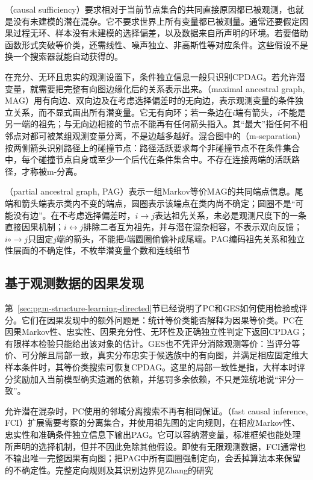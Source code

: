 （causal sufficiency）要求相对于当前节点集合的共同直接原因都已被观测，也就是没有未建模的潜在混杂。它不要求世界上所有变量都已被测量。通常还要假定因果过程无环、样本没有未建模的选择偏差，以及数据来自所声明的环境。若要借助函数形式突破等价类，还需线性、噪声独立、非高斯性等对应条件。这些假设不是换一个搜索器就能自动获得的。

在充分、无环且忠实的观测设置下，条件独立信息一般只识别CPDAG。若允许潜变量，就需要把完整有向图边缘化后的关系表示出来。（maximal ancestral graph, MAG）用有向边、双向边及在考虑选择偏差时的无向边，表示观测变量的条件独立关系，而不显式画出所有潜变量。它无有向环；若一条边在$i$端有箭头，$i$不能是另一端的祖先；与无向边相接的节点不能再有任何箭头指入。其“最大”指任何不相邻点对都可被某组观测变量分离，不是边越多越好。混合图中的（m-separation）按两侧箭头识别路径上的碰撞节点：路径活跃要求每个非碰撞节点不在条件集合中，每个碰撞节点自身或至少一个后代在条件集合中。不存在连接两端的活跃路径，才称被m-分离。

（partial ancestral graph, PAG）表示一组Markov等价MAG的共同端点信息。尾端和箭头端表示类内不变的端点，圆圈表示该端点在类内尚不确定；圆圈不是“可能没有边”。在不考虑选择偏差时，$i\to j$表达祖先关系，未必是观测尺度下的一条直接因果机制；$i\leftrightarrow j$排除二者互为祖先，并与潜在混杂相容，不表示双向反馈；$i\mathbin{\circ\!\!\to}j$只固定$j$端的箭头，不能把$i$端圆圈偷偷补成尾端。PAG编码祖先关系和独立性层面的不确定性，不枚举潜变量个数和连线细节

\subsection{基于观测数据的因果发现}
\label{sec:pgm-structure-learning-observational}

第~\ref{sec:pgm-structure-learning-directed}节已经说明了PC和GES如何使用检验或评分。它们在因果发现中的额外问题是：统计等价类能否解释为因果等价类。PC在因果Markov性、忠实性、因果充分性、无环性及正确独立性判定下返回CPDAG；有限样本检验只能给出该对象的估计。GES也不凭评分消除观测等价：当评分等价、可分解且局部一致，真实分布忠实于候选族中的有向图，并满足相应固定维大样本条件时，其等价类搜索可恢复CPDAG。这里的局部一致性是指，大样本时评分奖励加入当前模型确实遗漏的依赖，并惩罚多余依赖，不只是笼统地说“评分一致”。

允许潜在混杂时，PC使用的邻域分离搜索不再有相同保证。（fast causal inference, FCI）扩展需要考察的分离集合，并使用祖先图的定向规则，在相应Markov性、忠实性和准确条件独立信息下输出PAG。它可以容纳潜变量，标准框架也能处理所声明的选择机制，但并不因此免除其他假设。即使有无限观测数据，FCI通常也不输出唯一完整因果有向图；把PAG中所有圆圈强制定向，会丢掉算法本来保留的不确定性。完整定向规则及其识别边界见Zhang的研究

